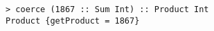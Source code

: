 \begin{repl}\begin{lstlisting}
> coerce (1867 :: Sum Int) :: Product Int
Product {getProduct = 1867}\end{lstlisting}\end{repl}
